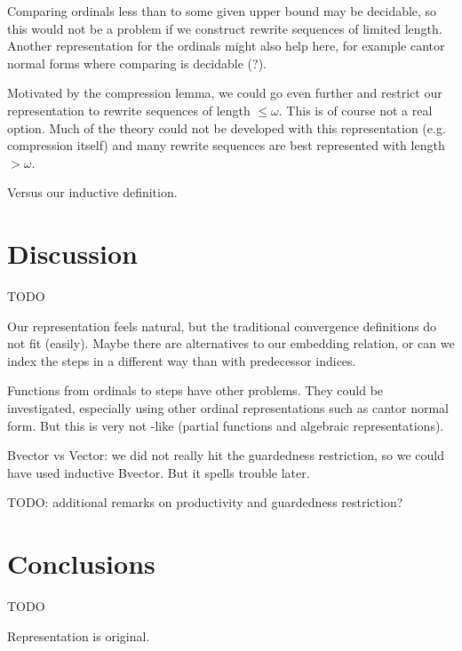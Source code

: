 Comparing ordinals less than to some given upper bound may be
decidable, so this would not be a problem if we construct rewrite
sequences of limited length. Another representation for the ordinals
might also help here, for example cantor normal forms where comparing
is decidable (?).

Motivated by the compression lemma, we could go even further and
restrict our representation to rewrite sequences of length $\le
\omega$. This is of course not a real option. Much of the theory could
not be developed with this representation (e.g. compression itself)
and many rewrite sequences are best represented with length $>
\omega$.

Versus our inductive definition.


\section{Discussion}

TODO

Our representation feels natural, but the traditional convergence
definitions do not fit (easily). Maybe there are alternatives to our
embedding relation, or can we index the steps in a different way than
with predecessor indices.

Functions from ordinals to steps have other problems. They could be
investigated, especially using other ordinal representations such as
cantor normal form. But this is very not \Coq-like (partial functions
and algebraic representations).

Bvector vs Vector: we did not really hit the guardedness restriction, so we
could have used inductive Bvector. But it spells trouble later.

TODO: additional remarks on productivity and guardedness restriction?


\section{Conclusions}

TODO

Representation is original.
